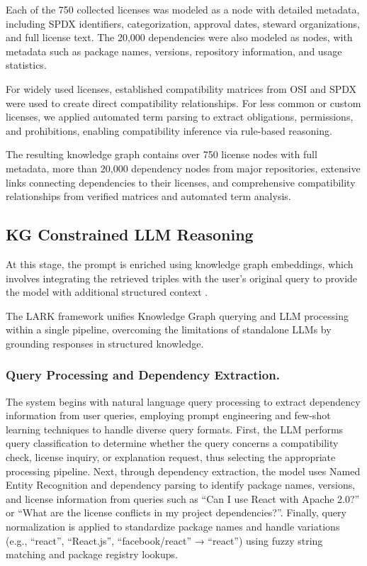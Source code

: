 Each of the 750 collected licenses was modeled as a node with detailed metadata, including SPDX identifiers, categorization, approval dates, steward organizations, and full license text. The 20,000 dependencies were also modeled as nodes, with metadata such as package names, versions, repository information, and usage statistics.

For widely used licenses, established compatibility matrices from OSI and SPDX were used to create direct compatibility relationships. For less common or custom licenses, we applied automated term parsing to extract obligations, permissions, and prohibitions, enabling compatibility inference via rule-based reasoning.

The resulting knowledge graph contains over 750 license nodes with full metadata, more than 20,000 dependency nodes from major repositories, extensive links connecting dependencies to their licenses, and comprehensive compatibility relationships from verified matrices and automated term analysis.


\subsection{KG Constrained LLM Reasoning}
\label{sec:KG_Constrained_Reasoning}

At this stage, the prompt is enriched using knowledge graph embeddings, which involves integrating the retrieved triples with the user’s original query to provide the model with additional structured context \cite{PanLWCWW24}.

The LARK framework unifies Knowledge Graph querying and LLM processing within a single pipeline, overcoming the limitations of standalone LLMs by grounding responses in structured knowledge.


\subsubsection{Query Processing and Dependency Extraction.}


The system begins with natural language query processing to extract dependency information from user queries, employing prompt engineering and few-shot learning techniques to handle diverse query formats. First, the LLM performs query classification to determine whether the query concerns a compatibility check, license inquiry, or explanation request, thus selecting the appropriate processing pipeline. Next, through dependency extraction, the model uses Named Entity Recognition and dependency parsing to identify package names, versions, and license information from queries such as “Can I use React with Apache 2.0?” or “What are the license conflicts in my project dependencies?”. Finally, query normalization is applied to standardize package names and handle variations (e.g., “react”, “React.js”, “facebook/react” → “react”) using fuzzy string matching and package registry lookups.


